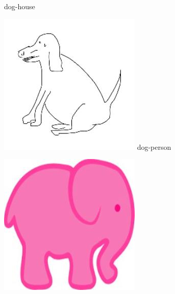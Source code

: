 \documentclass{article}
\begin{document}
\begin{center}
\begin{minipage}{0.142\textwidth}
        dog-house
    \end{minipage}%
    \begin{minipage}{0.142\textwidth}
        \includegraphics[width=\linewidth]{./pic/misclassified_r0_p6_1641.jpg}
        dog-person
    \end{minipage}%
    \begin{minipage}{0.142\textwidth}
        \includegraphics[width=\linewidth]{./pic/misclassified_r1_p2_2723.jpg}

\end{minipage}
\end{center}
\end{document}
